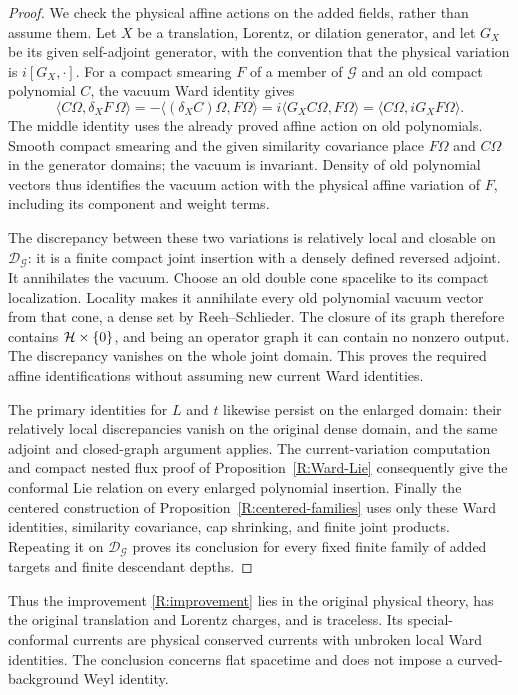 \begin{proof}
We check the physical affine actions on the added fields, rather
than assume them.  Let $X$ be a translation, Lorentz, or dilation
generator, and let $G_X$ be its given self-adjoint generator, with
the convention that the physical variation is $i[G_X,\cdot]$.
For a compact smearing $F$ of a member of $\mathcal G$ and an old
compact polynomial $C$, the vacuum Ward identity gives
\[
 \langle C\Omega,\delta_XF\,\Omega\rangle
 =-\langle(\delta_XC)\Omega,F\Omega\rangle
 =i\langle G_XC\Omega,F\Omega\rangle
 =\langle C\Omega,iG_XF\Omega\rangle.
\]
The middle identity uses the already proved affine action on old
polynomials.  Smooth compact smearing and the given similarity
covariance place $F\Omega$ and $C\Omega$ in the generator domains;
the vacuum is invariant.  Density of old polynomial vectors thus
identifies the vacuum action with the physical affine variation of
$F$, including its component and weight terms.

The discrepancy between these two variations is relatively local
and closable on $\mathcal D_{\mathcal G}$: it is a finite compact
joint insertion with a densely defined reversed adjoint.  It
annihilates the vacuum.  Choose an old double cone spacelike to its
compact localization.  Locality makes it annihilate every old
polynomial vacuum vector from that cone, a dense set by
Reeh--Schlieder.  The closure of its graph therefore contains
$\mathcal H\times\{0\}$, and being an operator graph it can contain no
nonzero output.  The discrepancy vanishes on the whole joint domain.
This proves the required affine identifications without assuming
new current Ward identities.

The primary identities for $L$ and $t$ likewise persist on the
enlarged domain: their relatively local discrepancies vanish on the
original dense domain, and the same adjoint and closed-graph argument
applies.  The current-variation computation and compact nested flux
proof of Proposition~\ref{R:Ward-Lie} consequently give the conformal
Lie relation on every enlarged polynomial insertion.  Finally the
centered construction of Proposition~\ref{R:centered-families} uses
only these Ward identities, similarity covariance, cap shrinking,
and finite joint products.  Repeating it on
$\mathcal D_{\mathcal G}$ proves its conclusion for every fixed
finite family of added targets and finite descendant depths.
\end{proof}

Thus the improvement \eqref{R:improvement} lies in the original
physical theory, has the original translation and Lorentz charges,
and is traceless.  Its special-conformal currents are physical
conserved currents with unbroken local Ward identities.  The
conclusion concerns flat spacetime and does not impose a
curved-background Weyl identity.

